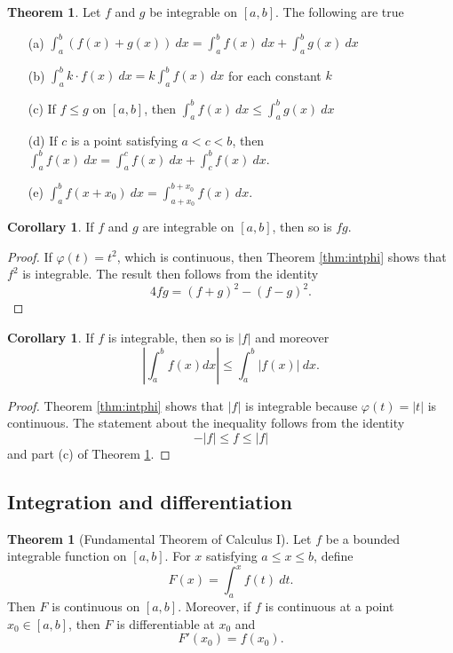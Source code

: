 \documentclass[12pt]{article}
\theoremstyle{definition}
\theoremstyle{theorem}
\newtheorem{theorem}[definition]{Theorem}
\newtheorem{corollary}[definition]{Corollary}
\begin{document}
\begin{theorem}\label{thm:intprop}
Let $f$ and $g$ be integrable on $[a,b]$. The following are true 
\begin{enumerate}
\item[(a)] $\int_a^b (f(x) + g(x)) \: dx = \int_a^b f(x)\: dx + \int_a^b g(x)\: dx$
\item[(b)] $\int_a^b k \cdot f(x)\: dx = k \int_a^b f(x)\: dx$ for each constant $k$
\item[(c)] If $f \leqslant g$ on $[a,b]$, then $\int_a^b f(x)\: dx \leqslant \int_a^b g(x)\: dx$
\item[(d)] If $c$ is a point satisfying $a < c < b$, then $\int_a^b f(x)\: dx = \int_a^c f(x)\: dx + \int_c^b f(x)\: dx$.
\item[(e)] $\int_{a}^b f(x + x_0) \: dx = \int_{a + x_0}^{b + x_0} f(x) \: dx.$
\end{enumerate}
\end{theorem}

\begin{corollary}\label{cor:intprod}
If $f$ and $g$ are integrable on $[a,b]$, then so is $fg$. 
\end{corollary}

\begin{proof}
If $\varphi(t) = t^2$, which is continuous, then Theorem \ref{thm:intphi} shows that $f^2$ is integrable. The result then follows from the identity 
\[
4fg = (f+g)^2 - (f - g)^2.
\] 
\end{proof}

\begin{corollary}
If $f$ is integrable, then so is $|f|$ and moreover 
\[
\left|\int_a^b f(x) dx\right| \leqslant \int_a^b |f(x)| \:dx .
\]
\end{corollary}

\begin{proof}
Theorem \ref{thm:intphi} shows that $|f|$ is integrable because $\varphi(t) = |t|$ is continuous. The statement about the inequality follows from the identity 
\[
-|f| \leqslant f \leqslant |f|
\]
and part (c) of Theorem \ref{thm:intprop}. 
\end{proof}

\subsection{Integration and differentiation}

\begin{theorem}[Fundamental Theorem of Calculus I]
Let $f$ be a bounded integrable function on $[a,b]$. For $x$ satisfying $a \leqslant x \leqslant b$, define 
\[
F(x) = \int_a^x f(t) \: dt.
\]
Then $F$ is continuous on $[a,b]$. Moreover, if $f$ is continuous at a point $x_0 \in [a,b]$, then $F$ is differentiable at $x_0$ and 
\[
F'(x_0) = f(x_0).
\]
\end{theorem}
\end{document}
